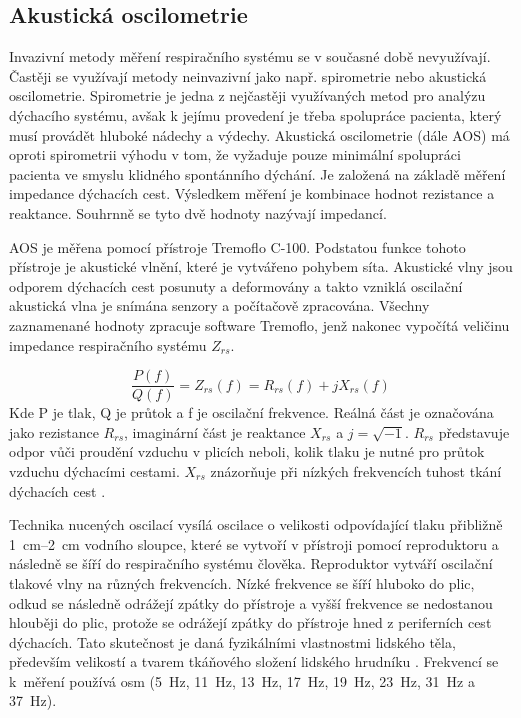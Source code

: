 \label{kap-metody}

\subsection {Akustická oscilometrie}
Invazivní metody měření respiračního systému se v současné době nevyužívají. Častěji se využívají metody neinvazivní jako např. spirometrie nebo akustická oscilometrie. Spirometrie je jedna z nejčastěji využívaných metod pro analýzu dýchacího systému, avšak k jejímu provedení je třeba spolupráce pacienta, který musí provádět hluboké nádechy a výdechy.
Akustická oscilometrie (dále AOS) má oproti spirometrii výhodu v tom, že vyžaduje pouze minimální spolupráci pacienta ve smyslu klidného spontánního dýchání. 
Je založená na základě měření impedance dýchacích cest. Výsledkem měření je kombinace hodnot rezistance a reaktance. Souhrnně se tyto dvě hodnoty nazývají impedancí. 

AOS je měřena pomocí přístroje Tremoflo C-100. Podstatou funkce tohoto přístroje je akustické vlnění, které je vytvářeno pohybem síta. Akustické vlny jsou odporem dýchacích cest posunuty a deformovány a takto vzniklá oscilační akustická vlna je snímána senzory a počítačově zpracována.
 Všechny zaznamenané hodnoty zpracuje software Tremoflo, jenž nakonec vypočítá veličinu impedance respiračního systému $Z_{rs}$. 

\begin{equation}
 \label{rce:1}
  \frac{P(f)}{Q(f)} = Z_{rs}(f) = R_{rs}(f) + j X_{rs}(f) 
\end{equation}
Kde P je tlak, Q je průtok a f je oscilační frekvence. 
Reálná část je označována jako rezistance $R_{rs}$, imaginární část je reaktance $X_{rs}$ a $j = \sqrt{-1}$. 
$R_{rs}$ představuje odpor vůči proudění vzduchu v plicích neboli, kolik tlaku je nutné pro průtok vzduchu dýchacími cestami. $X_{rs}$ znázorňuje při nízkých frekvencích tuhost tkání dýchacích cest  \cite{Alamer2016}.


Technika nucených oscilací vysílá oscilace o velikosti odpovídající tlaku přibližně \SI{1}{cm}--\SI{2}{cm} vodního sloupce, které se vytvoří v přístroji pomocí reproduktoru a následně se šíří do respiračního systému člověka. Reproduktor vytváří oscilační tlakové vlny na různých frekvencích. Nízké frekvence se šíří hluboko do plic, odkud se následně odrážejí zpátky do přístroje a vyšší frekvence se nedostanou hlouběji do plic, protože se  odrážejí zpátky do přístroje hned z periferních cest dýchacích. Tato skutečnost je daná fyzikálními vlastnostmi lidského těla, především velikostí a tvarem tkáňového složení lidského hrudníku \cite{Alamer2016}. Frekvencí se k~měření používá osm (\SI{5}{Hz}, \SI{11}{Hz}, \SI{13}{Hz}, \SI{17}{Hz}, \SI{19}{Hz}, \SI{23}{Hz}, \SI{31}{Hz} a  \SI{37}{Hz}). 

